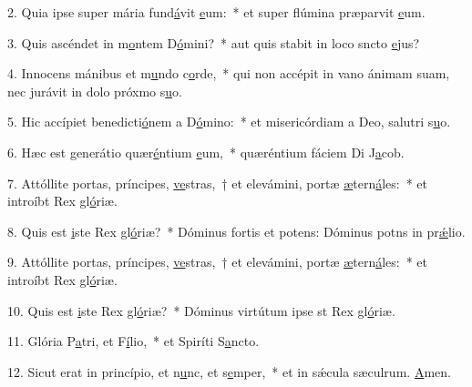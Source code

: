 2. Quia ipse super mária fund\uline{á}vit \uline{e}um:~* et super flúmina præparvit \uline{e}um.\par 
3. Quis ascéndet in m\uline{o}ntem D\uline{ó}mini?~* aut quis stabit in loco sncto \uline{e}jus?\par 
4. Innocens mánibus et m\uline{u}ndo c\uline{o}rde,~* qui non accépit in vano ánimam suam, nec jurávit in dolo próxmo s\uline{u}o.\par 
5. Hic accípiet benedicti\uline{ó}nem a D\uline{ó}mino:~* et misericórdiam a Deo, salutri s\uline{u}o.\par 
6. Hæc est generátio quær\uline{é}ntium \uline{e}um,~* quæréntium fáciem Di J\uline{a}cob.\par 
7. Attóllite portas, príncipes, \uline{ve}stras,~† et elevámini, portæ \uline{æ}tern\uline{á}les:~* et introíbt Rex gl\uline{ó}riæ.\par 
8. Quis est \uline{i}ste Rex gl\uline{ó}riæ?~* Dóminus fortis et potens: Dóminus potns in pr\uline{ǽ}lio.\par 
9. Attóllite portas, príncipes, \uline{ve}stras,~† et elevámini, portæ \uline{æ}tern\uline{á}les:~* et introíbt Rex gl\uline{ó}riæ.\par 
10. Quis est \uline{i}ste Rex gl\uline{ó}riæ?~* Dóminus virtútum ipse st Rex gl\uline{ó}riæ.\par 
11. Glória P\uline{a}tri, et F\uline{í}lio,~* et Spiríti S\uline{a}ncto.\par 
12. Sicut erat in princípio, et n\uline{u}nc, et s\uline{e}mper,~* et in sǽcula sæculrum. \uline{A}men.\par 
